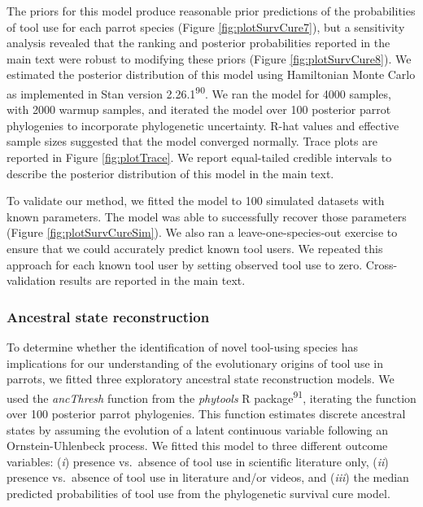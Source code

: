 \documentclass[
  man, donotrepeattitle,floatsintext]{apa6}
\begin{document}
The priors for this model produce reasonable prior predictions of the
probabilities of tool use for each parrot species (Figure
\ref{fig:plotSurvCure7}), but a sensitivity analysis revealed that the ranking
and posterior probabilities reported in the main text were robust to modifying
these priors (Figure \ref{fig:plotSurvCure8}). We estimated the
posterior distribution of this model using Hamiltonian Monte Carlo as
implemented in Stan version 2.26.1\textsuperscript{90}. We ran the model for 4000
samples, with 2000 warmup samples, and iterated the model over 100 posterior
parrot phylogenies to incorporate phylogenetic uncertainty. R-hat values and
effective sample sizes suggested that the model converged normally. Trace plots
are reported in Figure \ref{fig:plotTrace}. We report
equal-tailed credible intervals to describe the posterior distribution of this
model in the main text.

To validate our method, we fitted the model to 100 simulated datasets with known
parameters. The model was able to successfully recover those parameters
(Figure \ref{fig:plotSurvCureSim}). We also ran a
leave-one-species-out exercise to ensure that we could accurately predict known
tool users. We repeated this approach for each known tool user by setting
observed tool use to zero. Cross-validation results are reported in the main
text.

\hypertarget{ancestral-state-reconstruction}{%
\subsubsection{Ancestral state reconstruction}\label{ancestral-state-reconstruction}}

To determine whether the identification of novel tool-using species has
implications for our understanding of the evolutionary origins of tool use in
parrots, we fitted three exploratory ancestral state reconstruction models. We
used the \emph{ancThresh} function from the \emph{phytools} R package\textsuperscript{91},
iterating the function over 100 posterior parrot phylogenies. This function
estimates discrete ancestral states by assuming the evolution of a latent
continuous variable following an Ornstein-Uhlenbeck process. We fitted this
model to three different outcome variables: (\emph{i}) presence vs.~absence of tool
use in scientific literature only, (\emph{ii}) presence vs.~absence of tool use in
literature and/or videos, and (\emph{iii}) the median predicted probabilities of tool
use from the phylogenetic survival cure model.
\end{document}
